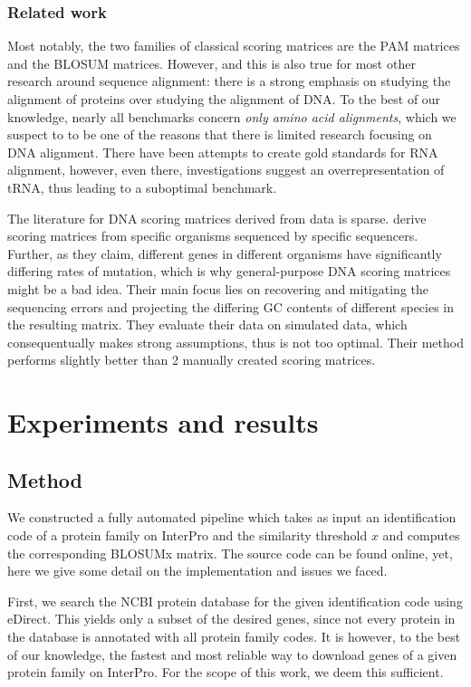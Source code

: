 \documentclass{article}
\begin{document}
\begin{multicols}{2}
\subsubsection*{Related work}

Most notably, the two families of classical scoring matrices are the PAM
matrices and the BLOSUM matrices. However, and this is also true for most other
research around sequence alignment: there is a strong emphasis on studying the
alignment of proteins over studying the alignment of DNA. To the best of our
knowledge, nearly all benchmarks concern \emph{only amino acid alignments}, which
we suspect to to be one of the reasons that there is limited research focusing
on DNA alignment. There have been attempts to create gold standards for RNA
alignment,
however, even there, investigations suggest an overrepresentation of tRNA, thus
leading to a suboptimal benchmark.

The literature for DNA scoring matrices derived from data is sparse.
\textcite{hamadaTrainingAlignmentParameters2017} derive scoring matrices from
specific organisms sequenced by specific sequencers. Further, as they claim,
different genes in different organisms have significantly differing rates of
mutation, which is why general-purpose DNA scoring matrices might be a bad
idea. Their main focus lies on recovering and mitigating the sequencing errors
and projecting the differing GC contents of different species in the resulting
matrix. They evaluate their data on simulated data, which consequentually makes
strong assumptions, thus is not too optimal. Their method performs slightly
better than 2 manually created scoring matrices.


\section*{Experiments and results}
\subsection*{Method}
We constructed a fully automated pipeline which takes as input an identification code of a protein
family on InterPro and the similarity threshold $x$ and computes the
corresponding BLOSUMx matrix. The source code can be found online, yet, here we
give some detail on the implementation and issues we faced.

First, we search the NCBI protein database for the given identification code
using eDirect. This yields only a subset of the desired genes, since not every
protein in the database is annotated with all protein family codes. It is
however, to the best of our knowledge, the fastest and most reliable way to
download genes of a given protein family on InterPro. For the scope of this
work, we deem this sufficient.


\end{multicols}
\end{document}
